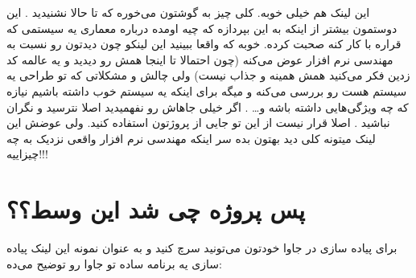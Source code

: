 \documentclass[]{article}
\begin{document}
\begin{flushleft}
\href{https://www.moesif.com/blog/api-guide/api-design-guidelines/}{\textcolor{blue}{\underline{}}}
\end{flushleft}

این لینک هم خیلی خوبه. کلی چیز به گوشتون می‌خوره که تا حالا نشنیدید . این دوستمون بیشتر از اینکه به این بپردازه که  چیه اومده درباره معماری یه سیستمی که قراره با  کار کنه صحبت کرده. خوبه که واقعا ببینید این لینکو چون دیدتون رو نسبت به مهندسی نرم افزار عوض می‌کنه (چون احتمالا تا اینجا همش  رو دیدید و یه عالمه کد زدین فکر می‌کنید همش همینه و جذاب نیست) ولی چالش و مشکلاتی که تو طراحی یه سیستم  هست رو بررسی می‌کنه و میگه برای اینکه یه سیستم خوب داشته باشیم نیازه که چه ویژگی‌هایی داشته باشه و… . اگر خیلی جاهاش رو نفهمیدید اصلا نترسید و نگران نباشید . اصلا قرار نیست از این تو جایی از پروژتون استفاده کنید. ولی عوضش این لینک میتونه کلی دید بهتون بده سر اینکه مهندسی نرم افزار واقعی نزدیک به چه چیزاییه!!!

\begin{flushleft}
\href{https://blog.feathersjs.com/design-patterns-for-modern-web-apis-1f046635215}{\textcolor{blue}{\underline{}}}
\end{flushleft}

\section*{{\titr پس پروژه چی شد این وسط؟؟
}}

برای پیاده سازی  در جاوا خودتون می‌تونید سرچ کنید و به عنوان نمونه این لینک پیاده سازی یه برنامه ساده  تو جاوا رو توضیح می‌ده:

\begin{flushleft}
\href{https://happycoding.io/tutorials/java-server/rest-api#simple-example-rest-api}{\textcolor{blue}{\underline{}}}
\end{flushleft}
\end{document}
